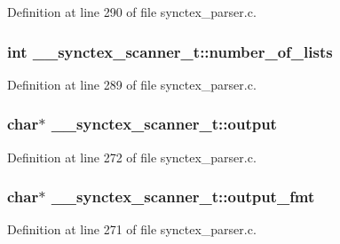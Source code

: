 Definition at line 290 of file synctex\+\_\+parser.\+c.

\hypertarget{struct____synctex__scanner__t_a50a90639f1b9198207b0066c333285b3}{
\subsubsection[{number\+\_\+of\+\_\+lists}]{\setlength{\rightskip}{0pt plus 5cm}int \+\_\+\+\_\+synctex\+\_\+scanner\+\_\+t\+::number\+\_\+of\+\_\+lists}}\label{struct____synctex__scanner__t_a50a90639f1b9198207b0066c333285b3}


Definition at line 289 of file synctex\+\_\+parser.\+c.

\hypertarget{struct____synctex__scanner__t_a0c31d194ab4bab987d0d93719731856e}{
\subsubsection[{output}]{\setlength{\rightskip}{0pt plus 5cm}char$\ast$ \+\_\+\+\_\+synctex\+\_\+scanner\+\_\+t\+::output}}\label{struct____synctex__scanner__t_a0c31d194ab4bab987d0d93719731856e}


Definition at line 272 of file synctex\+\_\+parser.\+c.

\hypertarget{struct____synctex__scanner__t_a6b47843cf9ba4e354ec770fcf3224383}{
\subsubsection[{output\+\_\+fmt}]{\setlength{\rightskip}{0pt plus 5cm}char$\ast$ \+\_\+\+\_\+synctex\+\_\+scanner\+\_\+t\+::output\+\_\+fmt}}\label{struct____synctex__scanner__t_a6b47843cf9ba4e354ec770fcf3224383}


Definition at line 271 of file synctex\+\_\+parser.\+c.

